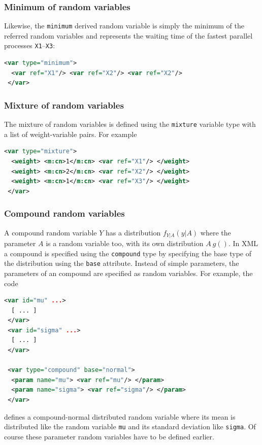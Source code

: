 \documentclass[a4paper, 10pt]{paper}
\newcommand{\code}[1]{\texttt{#1}}
\begin{document}
\subsubsection{Minimum of random variables}
Likewise, the \code{minimum} derived random variable is simply the minimum of the referred random
variables and represents the waiting time of the fastest parallel processes \code{X1}--\code{X3}:
\begin{lstlisting}[language=XML]
 <var type="minimum">
  <var ref="X1"/> <var ref="X2"/> <var ref="X2"/>
 </var>
\end{lstlisting}

\subsubsection{Mixture of random variables}
The mixture of random variables is defined using the \code{mixture} variable type with a list of
weight-variable pairs. For example
\begin{lstlisting}[language=XML]
 <var type="mixture">
  <weight> <m:cn>1</m:cn> <var ref="X1"/> </weight>
  <weight> <m:cn>2</m:cn> <var ref="X2"/> </weight>
  <weight> <m:cn>1</m:cn> <var ref="X3"/> </weight>
 </var>
\end{lstlisting}

\subsubsection{Compound random variables} 
A compound random variable $Y$ has a distribution $f_{Y|A}(y|A)$ where the parameter $A$ is a random
variable too, with its own distribution $A~g()$. In XML a compound is specified using the 
\code{compound} type by specifying the base type of the distribution using the \code{base} attribute.
Instead of simple parameters, the parameters of an compound are specified as random variables. 
For example, the code
\begin{lstlisting}[language=XML]
 <var id="mu" ...>
  [ ... ]
 </var>
 <var id="sigma" ...>
  [ ... ]
 </var>
 
 <var type="compound" base="normal">
  <param name="mu"> <var ref="mu"/> </param>
  <param name="sigma"> <var ref="sigma"/> </param>
 </var>
\end{lstlisting}
defines a compound-normal distributed random variable where its mean is distributed like the random 
variable \code{mu} and its standard deviation like \code{sigma}. Of course these parameter random 
variables have to be defined earlier.
\end{document}
